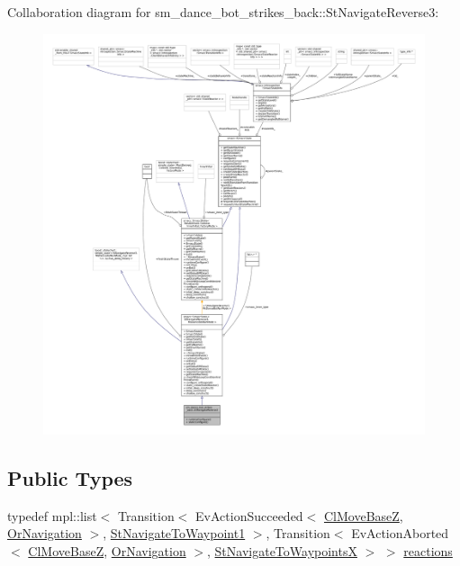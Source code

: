 Collaboration diagram for sm\+\_\+dance\+\_\+bot\+\_\+strikes\+\_\+back\+:\+:St\+Navigate\+Reverse3\+:
\nopagebreak
\begin{figure}[H]
\begin{center}
\leavevmode
\includegraphics[width=350pt]{structsm__dance__bot__strikes__back_1_1StNavigateReverse3__coll__graph}
\end{center}
\end{figure}
\subsection*{Public Types}
\begin{DoxyCompactItemize}
\item 
typedef mpl\+::list$<$ Transition$<$ Ev\+Action\+Succeeded$<$ \hyperlink{classmove__base__z__client_1_1ClMoveBaseZ}{Cl\+Move\+BaseZ}, \hyperlink{classsm__dance__bot__strikes__back_1_1OrNavigation}{Or\+Navigation} $>$, \hyperlink{structsm__dance__bot__strikes__back_1_1StNavigateToWaypoint1}{St\+Navigate\+To\+Waypoint1} $>$, Transition$<$ Ev\+Action\+Aborted$<$ \hyperlink{classmove__base__z__client_1_1ClMoveBaseZ}{Cl\+Move\+BaseZ}, \hyperlink{classsm__dance__bot__strikes__back_1_1OrNavigation}{Or\+Navigation} $>$, \hyperlink{structsm__dance__bot__strikes__back_1_1StNavigateToWaypointsX}{St\+Navigate\+To\+WaypointsX} $>$ $>$ \hyperlink{structsm__dance__bot__strikes__back_1_1StNavigateReverse3_a5c1180a82dc742066f74de9218d14b4e}{reactions}
\end{DoxyCompactItemize}
